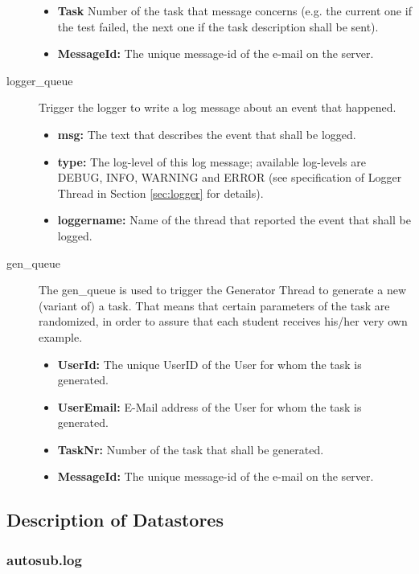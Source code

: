 \begin{description}
\begin{itemize}
        \item {\bf Task} Number of the task that message concerns (e.g. the current one if the test failed, 
        the next one if the task description shall be sent).
        \item {\bf MessageId:} The unique message-id of the e-mail on the server.
    \end{itemize}
\item [logger\_queue] Trigger the logger to write a log message about an event that happened.
    \begin{itemize}
        \item {\bf msg:} The text that describes the event that shall be logged.
        \item {\bf type:} The log-level of this log message; available log-levels are DEBUG, INFO, 
            WARNING and ERROR (see specification of Logger Thread in Section \ref{sec:logger} for details).
        \item {\bf loggername:} Name of the thread that reported the event that shall be logged.
    \end{itemize}
\item [gen\_queue] The gen\_queue is used to trigger the Generator Thread to generate a new (variant of) a 
    task. That means that certain parameters of the task are randomized, in order to assure that each student 
    receives his/her very own example. 
	\begin{itemize}
        \item {\bf UserId:} The unique UserID of the User for whom the task is generated.
        \item {\bf UserEmail:} E-Mail address of the User for whom the task is generated.
        \item {\bf TaskNr:} Number of the task that shall be generated.
        \item {\bf MessageId:} The unique message-id of the e-mail on the server.
    \end{itemize}
\end{description}

\subsection{Description of Datastores}

\subsubsection{autosub.log}

